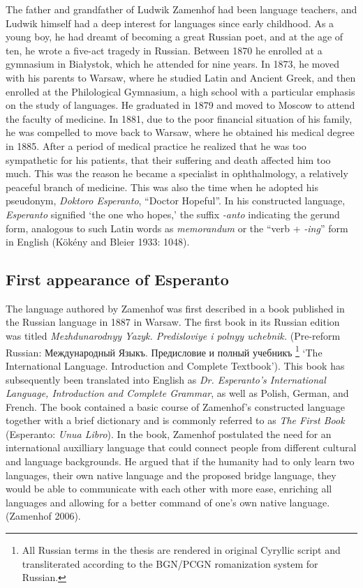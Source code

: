 The father and grandfather of Ludwik Zamenhof had been language teachers, and Ludwik himself had a deep interest for languages since early childhood.
As a young boy, he had dreamt of becoming a great Russian poet, and at the age of ten, he wrote a five-act tragedy in Russian.
Between 1870 he enrolled at a gymnasium in Białystok, which he attended for nine years.
In 1873, he moved with his parents to Warsaw, where he studied Latin and Ancient Greek, and then enrolled at the Philological Gymnasium, a high school with a particular emphasis on the study of languages.
He graduated in 1879 and moved to Moscow to attend the faculty of medicine.
In 1881, due to the poor financial situation of his family, he was compelled to move back to Warsaw, where he obtained his medical degree in 1885.
After a period of medical practice he realized that he was too sympathetic for his patients, that their suffering and death affected him too much.
This was the reason he became a specialist in ophthalmology, a relatively peaceful branch of medicine.
This was also the time when he adopted his pseudonym, \textit{Doktoro Esperanto}, ``Doctor Hopeful''.
In his constructed language, \textit{Esperanto} signified `the one who hopes,'
the suffix \textit{-anto} indicating the gerund form, analogous to such Latin words as \textit{memorandum} or the ``verb + \textit{-ing}'' form in English
(Kökény and Bleier 1933: 1048).

\subsection{First appearance of Esperanto}
The language authored by Zamenhof was first described in a book published in the Russian language in 1887 in Warsaw.
The first book in its Russian edition was titled \textit{Mezhdunarodnyy Yazyk. Predisloviye i polnyy uchebnik.}
(Pre-reform Russian: Между\-на\-род\-ный Языкъ. Предисловие и полный учебникъ%
\footnote{All Russian terms in the thesis are rendered in original Cyryllic script and transliterated according to the BGN/PCGN romanization system for Russian.} `The International Language. Introduction and Complete Textbook').
This book has subsequently been translated into English as \textit{Dr. Esperanto's International Language, Introduction and Complete Grammar}, as well as Polish, German, and French.
The book contained a basic course of Zamenhof's constructed language together with a brief dictionary and is commonly referred to as \textit{The First Book} (Esperanto: \textit{Unua Libro}).
In the book, Zamenhof postulated the need for an international auxilliary language that could connect people from different cultural and language backgrounds.
He argued that if the humanity had to only learn two languages, their own native language and the proposed bridge language, they would be able to communicate with each other with more ease, enriching all languages and allowing for a better command of one's own native language.
(Zamenhof 2006).

